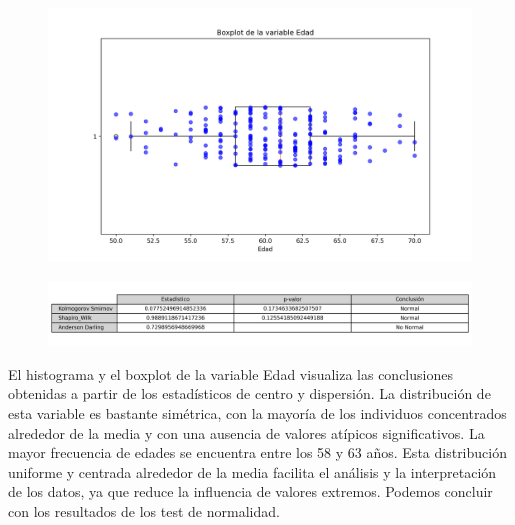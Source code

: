 \documentclass[a4paper, 12pt]{article}
\begin{document}
\begin{figure}[H]
    \centering
    \includegraphics[width=1\textwidth]{img/Boxplot/Boxplt_Edad.png}
\end{figure}

\begin{figure}[H]
    \centering
    \includegraphics[width=1\textwidth]{img/Tablas/test_normalidad_Edad.png}
\end{figure}


El histograma y el boxplot de la variable Edad visualiza las conclusiones obtenidas a partir de los estadísticos de centro y 
dispersión. La distribución de esta variable es bastante simétrica, con la mayoría de los individuos concentrados alrededor 
de la media y con una ausencia de valores atípicos significativos. La mayor frecuencia de edades se encuentra entre los 58 y 63 años. Esta distribución uniforme y centrada alrededor de la media 
facilita el análisis y la interpretación de los datos, ya que reduce la influencia de valores extremos. Podemos concluir con los resultados de los test de normalidad.
\end{document}
